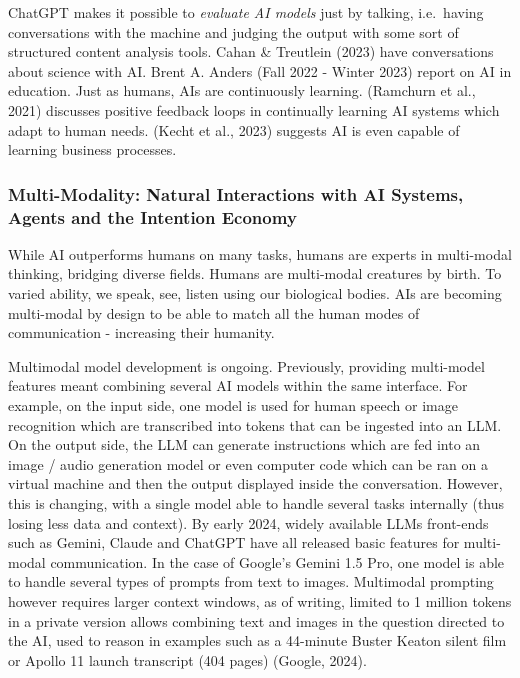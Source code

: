 \documentclass[
  12pt,
  letterpaper,
  DIV=11,
  numbers=noendperiod]{scrartcl}
\begin{document}
ChatGPT makes it possible to \emph{evaluate AI models} just by talking,
i.e.~having conversations with the machine and judging the output with
some sort of structured content analysis tools. Cahan \& Treutlein
(2023) have conversations about science with AI. Brent A. Anders (Fall
2022 - Winter 2023) report on AI in education. Just as humans, AIs are
continuously learning. (Ramchurn et al., 2021) discusses positive
feedback loops in continually learning AI systems which adapt to human
needs. (Kecht et al., 2023) suggests AI is even capable of learning
business processes.

\subsubsection{Multi-Modality: Natural Interactions with AI Systems,
Agents and the Intention
Economy}\label{multi-modality-natural-interactions-with-ai-systems-agents-and-the-intention-economy}

While AI outperforms humans on many tasks, humans are experts in
multi-modal thinking, bridging diverse fields. Humans are multi-modal
creatures by birth. To varied ability, we speak, see, listen using our
biological bodies. AIs are becoming multi-modal by design to be able to
match all the human modes of communication - increasing their humanity.

Multimodal model development is ongoing. Previously, providing
multi-model features meant combining several AI models within the same
interface. For example, on the input side, one model is used for human
speech or image recognition which are transcribed into tokens that can
be ingested into an LLM. On the output side, the LLM can generate
instructions which are fed into an image / audio generation model or
even computer code which can be ran on a virtual machine and then the
output displayed inside the conversation. However, this is changing,
with a single model able to handle several tasks internally (thus losing
less data and context). By early 2024, widely available LLMs front-ends
such as Gemini, Claude and ChatGPT have all released basic features for
multi-modal communication. In the case of Google's Gemini 1.5 Pro, one
model is able to handle several types of prompts from text to images.
Multimodal prompting however requires larger context windows, as of
writing, limited to 1 million tokens in a private version allows
combining text and images in the question directed to the AI, used to
reason in examples such as a 44-minute Buster Keaton silent film or
Apollo 11 launch transcript (404 pages) (Google, 2024).
\end{document}
